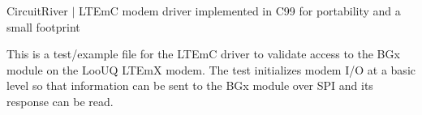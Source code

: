 Circuit\+River $\vert$ LTEmC modem driver implemented in C99 for portability and a small footprint

This is a test/example file for the LTEmC driver to validate access to the BGx module on the Loo\+UQ LTEmX modem. The test initializes modem I/O at a basic level so that information can be sent to the BGx module over SPI and its response can be read. 